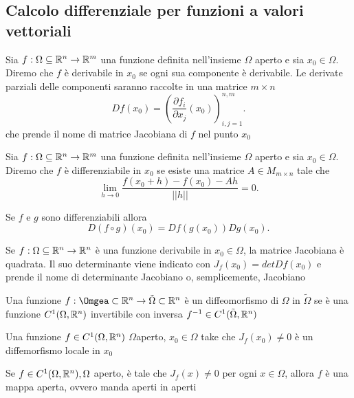 \documentclass[12px]{article}
\begin{document}
	\subsection{Calcolo differenziale per funzioni a valori vettoriali}
	\begin{defi}
		Sia $f:\Omega\subseteq\mathbb{R}^n \rightarrow\mathbb{R}^m$ una funzione definita nell'insieme $\Omega$ aperto e sia $x_0\in\Omega$. Diremo che $f$ è derivabile in $x_0$ se ogni sua componente è derivabile. Le derivate parziali delle componenti saranno raccolte in una matrice $m\times n$
		\[
			Df(x_0) = \left(\frac{\partial f_i}{\partial x_j}(x_0) \right)^{n,m}_{i,j=1}
		.\] 
		che prende il nome di matrice  Jacobiana di $f$ nel punto $x_0$
	\end{defi}
	\begin{defi}[Differenziabilità]
		Sia $f:\Omega\subseteq\mathbb{R}^n \rightarrow \mathbb{R}^m$ una funzione definita nell'insieme $\Omega$ aperto e sia $x_0\in\Omega$. Diremo che $f$ è differenziabile in $x_0$ se esiste una matrice $A\in M_{m\times n}$ tale che
		 \[
			 \lim_{h \rightarrow 0} \frac {f(x_0 + h) - f(x_0) - Ah}{||h||} = 0
		.\] 
	\end{defi}
	\begin{teo}
		Se $f$ e $g$ sono differenziabili allora
		\[
		D(f\circ g)(x_0) = Df(g(x_0))Dg(x_0)
		.\] 
	\end{teo}
	\begin{defi}[Jacobiano]
		Se $f:\Omega\subseteq\mathbb{R}^n \rightarrow\mathbb{R}^n$ è una funzione derivabile in $x_0\in\Omega$, la matrice Jacobiana è quadrata. Il suo determinante viene indicato con $J_f(x_0) = det Df(x_0)$ e prende il nome di determinante Jacobiano o, semplicemente, Jacobiano
	\end{defi}
	\begin{defi}[Diffeomorfismo]
		Una funzione $f:\Omgea\subset \R^n \rightarrow\tilde\Omega\subset\R^n$ è un diffeomorfismo di $\Omega$ in $\tilde\Omega$ se è una funzione  $C^1(\Omega,\mathbb{R}^n)$ invertibile con inversa $f^{-1}\in C^1(\tilde\Omega, \mathbb{R}^n)$
	\end{defi}
	\begin{teo}
		Una funzione $f\in C^1(\Omega,\mathbb{R}^n)$ $\Omega$aperto,  $x_0\in\Omega$ take che $J_f(x_0) \neq 0$ è un diffemorfismo locale in $x_0$
	\end{teo}
	\begin{coro}
		Se $f\in C^1(\Omega,\mathbb{R}^n), \Omega$ aperto, è tale che  $J_f(x)\neq 0$ per ogni  $x\in\Omega$, allora  $f$ è una mappa aperta, ovvero manda aperti in aperti
	\end{coro}
\end{document}

